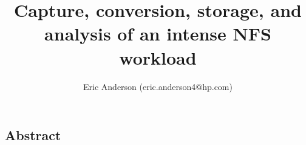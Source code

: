 \documentclass[twocolumn, 10pt]{article}
\begin{document}
\title{\Large \bf Capture, conversion, storage, and analysis of an intense NFS workload}

\author{Eric Anderson (eric.anderson4@hp.com)}
\date{}
\maketitle


\subsection*{Abstract}









\end{document}
